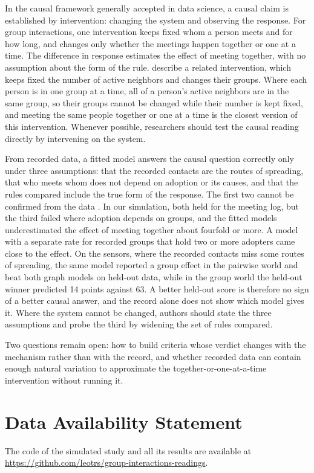 \documentclass[utf8]{FrontiersinHarvard}
\begin{document}
In the causal framework generally accepted in data science, a causal claim is established by intervention: changing the system and observing the response. For group interactions, one intervention keeps fixed whom a person meets and for how long, and changes only whether the meetings happen together or one at a time. The difference in response estimates the effect of meeting together, with no assumption about the form of the rule. \citet{rommens2026} describe a related intervention, which keeps fixed the number of active neighbors and changes their groups. Where each person is in one group at a time, all of a person's active neighbors are in the same group, so their groups cannot be changed while their number is kept fixed, and meeting the same people together or one at a time is the closest version of this intervention. Whenever possible, researchers should test the causal reading directly by intervening on the system.

From recorded data, a fitted model answers the causal question correctly only under three assumptions: that the recorded contacts are the routes of spreading, that who meets whom does not depend on adoption or its causes, and that the rules compared include the true form of the response. The first two cannot be confirmed from the data \citep{pearl2009overview,shalizi2011}. In our simulation, both held for the meeting log, but the third failed where adoption depends on groups, and the fitted models underestimated the effect of meeting together about fourfold or more. A model with a separate rate for recorded groups that hold two or more adopters came close to the effect. On the sensors, where the recorded contacts miss some routes of spreading, the same model reported a group effect in the pairwise world and beat both graph models on held-out data, while in the group world the held-out winner predicted 14 points against 63. A better held-out score is therefore no sign of a better causal answer, and the record alone does not show which model gives it. Where the system cannot be changed, authors should state the three assumptions and probe the third by widening the set of rules compared.

Two questions remain open: how to build criteria whose verdict changes with the mechanism rather than with the record, and whether recorded data can contain enough natural variation to approximate the together-or-one-at-a-time intervention without running it.

\section*{Data Availability Statement}
The code of the simulated study and all its results are available at \url{https://github.com/leotrs/group-interactions-readings}.
\end{document}
